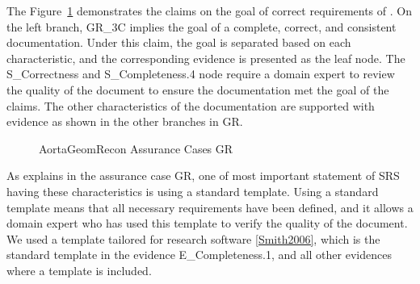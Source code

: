 The Figure~\ref{fig_agr_ac_gr} demonstrates the claims on the goal of correct requirements of \progname{}. On the left branch, GR\_3C implies the goal of a complete, correct, and consistent documentation. Under this claim, the goal is separated based on each characteristic, and the corresponding evidence is presented as the leaf node. The S\_Correctness and S\_Completeness.4 node require a domain expert to review the quality of the document to ensure the documentation met the goal of the claims. The other characteristics of the documentation are supported with evidence as shown in the other branches in GR.

\begin{figure}[hp]
    \centering
    \caption[AortaGeomRecon Assurance Cases GR]{AortaGeomRecon Assurance Cases GR}
    \label{fig_agr_ac_gr}
\end{figure}

As explains in the assurance case GR, one of  most important statement of SRS having these characteristics is using a standard template. Using  a standard template means that all necessary requirements have been defined, and it allows a domain expert who has used this template to verify the quality of the document. We used a template tailored for research software \ref{Smith2006}, which is the standard template in the evidence E\_Completeness.1, and all other evidences where a template is included.

